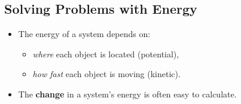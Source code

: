 \documentclass[]{article}
\begin{document}
\newpage
\begin{TeacherMargin}

\end{TeacherMargin}
\begin{PresentSpace}
\vspace{-10pt}
\section*{Solving Problems with Energy}
\vspace{-10pt}
\begin{itemize}
	\item The energy of a system depends on:
	\begin{itemize}
		\item \textit{where} each object is located (potential),
		\item \textit{how fast} each object is moving (kinetic).
	\end{itemize}
	\item The \textbf{change} in a system's energy is often easy to calculate.
\end{itemize}
\end{PresentSpace}
\newpage
\end{document}
